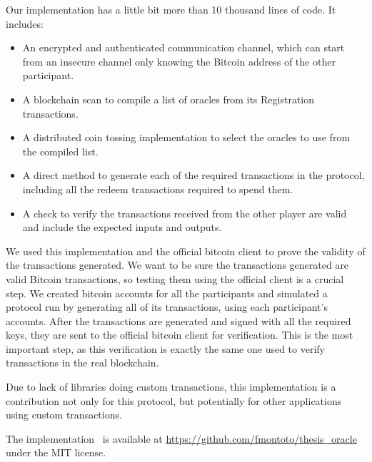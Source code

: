 Our implementation has a little bit more than 10 thousand lines of code.
It includes:
\begin{itemize}
\item An encrypted and authenticated communication channel, which can start from
  an insecure channel only knowing the Bitcoin address of the other
  participant.

\item A blockchain scan to compile a list of oracles from its Registration
  transactions.

\item A distributed coin tossing implementation to select the oracles to use
  from the compiled list.

\item A direct method to generate each of the required transactions in the
  protocol, including all the redeem transactions required to spend them.

\item A check to verify the transactions received from the other player are
  valid and include the expected inputs and outputs.
\end{itemize}

We used this implementation and the official bitcoin client to prove the
  validity of the transactions generated.
We want to be sure the transactions generated are valid Bitcoin transactions,
  so testing them using the official client is a crucial step.
We created bitcoin accounts for all the participants and simulated a
  protocol run by generating all of its transactions, using each participant's
  accounts.
After the transactions are generated and signed with all the required keys,
  they are sent to the official bitcoin client for verification.
This is the most important step, as this verification is exactly the same one
  used to verify transactions in the real blockchain.

Due to lack of libraries doing custom transactions, this implementation is
  a contribution not only for this protocol, but potentially for other
  applications using custom transactions.

The implementation~\cite{implementation} is available at
  \url{https://github.com/fmontoto/thesis_oracle} under the MIT license.
